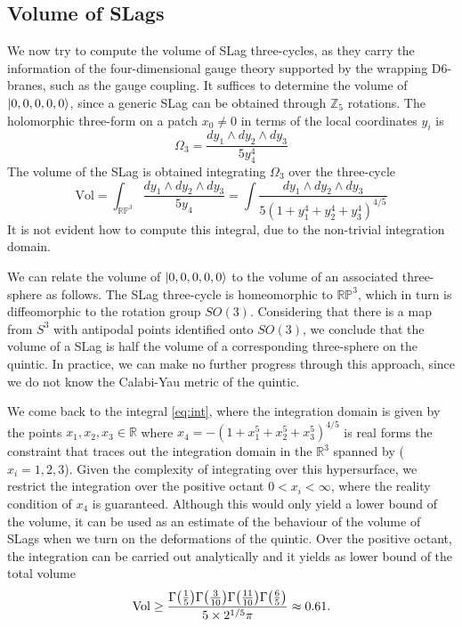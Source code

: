 \subsection{Volume of SLags}
\label{ss:vol}
We now try to compute the volume of SLag three-cycles, as they carry the information of the four-dimensional
gauge theory supported by the wrapping D$6$-branes, such as the gauge coupling.
It suffices to determine the volume of $\ket{0,0,0,0,0}$, since a generic SLag can be obtained through $\mathbb Z_5$ rotations.
The holomorphic three-form on a patch $x_0\neq0$ in terms of the local coordinates $y_i$ is
\begin{equation}
  \Omega_3=\frac{dy_1\wedge dy_2\wedge dy_3}{5y_4^4}
\end{equation}
The volume of the SLag is obtained integrating $\Omega_3$ over the three-cycle
\begin{equation}
  \mathrm{Vol}=\int_{\mathbb{RP}^3}\frac{dy_1\wedge dy_2\wedge dy_3}{5 y_4}=
\int \frac{dy_1\wedge dy_2\wedge dy_3}{5(1+y_1^4+y_2^4+y_3^4)^{4/5}}
\label{eq:int}
\end{equation}
It is not evident how to compute this integral, due to the non-trivial integration domain.

We can relate the volume of $\ket{0,0,0,0,0}$ to the volume of an associated three-sphere as follows.
The SLag three-cycle is homeomorphic to $\mathbb{RP}^3$, which in turn is diffeomorphic to the rotation group $SO(3)$. 
Considering that there is a map from $S^3$ with antipodal points identified onto $SO(3)$,
we conclude that the volume of a SLag is half the volume of a corresponding three-sphere on the quintic.
In practice, we can make no further progress through this approach, since we do not know
the Calabi-Yau metric of the quintic.

We come back to the integral \eqref{eq:int},
where the integration domain is given by the points $x_1,x_2,x_3 \in \mathbb R$ where $x_4=-(1+x_1^5+x_2^5+x_3^5)^{4/5}$ is real
forms the constraint that traces out the integration domain in the $\mathbb{R}^3$ spanned by ($x_i=1,2,3$).
Given the complexity of integrating over this hypersurface, we restrict the integration over the positive octant $0<x_i<\infty$, 
where the reality condition of $x_4$ is guaranteed.
Although this would only yield a lower bound of the volume, it can be used as an estimate of
the behaviour of the volume of SLags when we turn on the deformations of the quintic.
Over the positive octant, the integration can be carried out analytically and it yields as lower
bound of the total volume
\begin{equation}
  \mathrm{Vol}\geq\frac{\Gamma\qty(\frac{1}{5})\Gamma\qty(\frac{3}{10})\Gamma\qty(\frac{11}{10})\Gamma\qty(\frac{6}{5})}{5 \times 2^{1/5}\pi}\approx 0.61.
  \label{eq:vol}
\end{equation}

